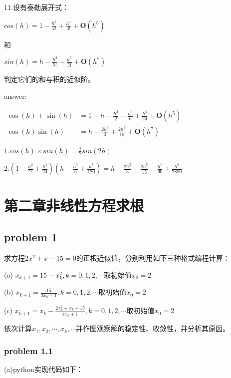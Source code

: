 \documentclass[UTF8]{ctexart}
\begin{document}
11.设有泰勒展开式：

\quad \quad $ cos(h)=1-\frac{h^2}{2!} + \frac{h^4}{4!} +  \boldsymbol{O} (h^5)$

和

\quad \quad $ sin(h)=h-\frac{h^3}{3!} + \frac{h^5}{5!} +  \boldsymbol{O} (h^7)$

判定它们的和与积的近似阶。

answer:

$\begin{aligned} \cos (h)+\sin (h) &=1+h-\frac{h^{2}}{2}-\frac{h^{3}}{6}+\frac{h^{4}}{24}+\boldsymbol{O}\left(h^{5}\right) \\ \cos (h) \sin (h) &=h-\frac{2 h^{3}}{3}+\frac{2 h^{5}}{15}+\boldsymbol{O}\left(h^{7}\right) \end{aligned}$

$1. cos(h)\times sin(h)=\frac{1}{2} sin(2h) $


$2. \left(1-\frac{h^{2}}{2}+\frac{h^{4}}{24}\right)\left(h-\frac{h^{3}}{6}+\frac{h^{5}}{120}\right)=h-\frac{2 h^{3}}{3}+\frac{2 h^{5}}{15}-\frac{h^{7}}{90}+\frac{h^{9}}{2880}$




\newpage
\section{第二章非线性方程求根}



\subsection{problem 1}


求方程$2 x^{2}+x-15=0$的正根近似值，分别利用如下三种格式编程计算：

(a)
$x_{k+1}=15-x_{k}^{2}, k=0,1,2, \cdots$取初始值$ x_0 =2$

(b)
$ x_{k+1}=\frac{15}{2 x_k+1}, k=0,1,2, \cdots$取初始值$ x_0 =2$

(c)
$ x_{k+1}=x_{k}-\frac{2 x_{k}^{2}+x_{k}-15}{4 x_{k}+1}, k=0,1,2, \cdots$取初始值$ x_0 =2$

依次计算$x_{1}, x_{2}, \cdots, x_{k}, \cdots$并作图观察解的稳定性、收敛性，并分析其原因。


\subsubsection{problem 1.1}



(a)python实现代码如下：
\end{document}
